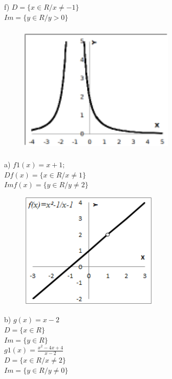 \begin{respostas}{3}
	f)  \( D= \{ x \in R/x \neq -1 \}  \)\\\( Im= \{ y \in R/y>0 \} \)

	\begin{figure}[H]
		\begin{Center}
			\includegraphics[width=2.92in,height=2.46in]{capitulos/outras_funcoes/media/image45.pdf}
		\end{Center}
	\end{figure}

	\setcounter{enumi}{2}
	\ansitem a) \( f1 \left( x \right) =x+1;  \) \\ \( Df \left( x \right) = \{ x \in R/x \neq 1 \}  \)\\\(Imf \left( x \right) = \{ y \in R/y \neq 2 \} \)

	\begin{figure}[H]
		\begin{Center}
			\includegraphics[width=2.62in,height=2.21in]{capitulos/outras_funcoes/media/image46.png}
		\end{Center}
	\end{figure}

	b) \( g \left( x \right) =x-2\) \\ \(D= \{ x \in R \}  \) \\ \( Im= \{ y \in R \}  \)\\ 

	\( g1 \left( x \right) =\frac{x^2-4x+4}{x-2}\)\\\(D= \{ x \in R/x \neq 2 \}  \) \\\( Im= \{ y \in R/y \neq 0 \}\)


\end{respostas}
